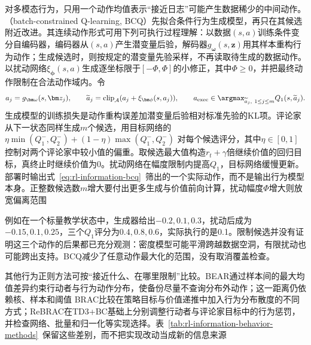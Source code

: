 对多模态行为，只用一个动作均值表示“接近日志”可能产生数据稀少的中间动作。（batch-constrained Q-learning, BCQ）先拟合条件行为生成模型，再只在其候选附近改进。其连续动作形式可用下列可执行过程理解：以数据$(s,a)$训练条件变分自编码器，编码器从$(s,a)$产生潜变量后验，解码器$g_{\bm\omega}(s,\bm z)$用其样本重构行为动作；生成候选时，则按规定的潜变量先验采样，不再读取待生成的数据动作。以扰动网络$\xi_{\bm\phi}(s,a)$生成逐坐标限于$[-\Phi,\Phi]$的小修正，其中$\Phi\geq0$，并把最终动作限制在合法动作域内。令
\begin{equation}
  \label{eq:rl-information-bcq}
  a_j=g_{\bm\omega}(s,\bm z_j),\qquad
  \widetilde a_j=\operatorname{clip}_{\mathcal A}
                  (a_j+\xi_{\bm\phi}(s,a_j)),\qquad
  a_{\mathrm{exec}}\in\argmax_{\widetilde a_j,\ 1\leq j\leq m}
                  Q_1(s,\widetilde a_j).
\end{equation}
生成模型的训练损失是动作重构误差加潜变量后验相对标准先验的KL项。评论家从下一状态同样生成$m$个候选，用目标网络的
$\eta\min(Q_1^-,Q_2^-)+(1-\eta)\max(Q_1^-,Q_2^-)$
对每个候选评分，其中$\eta\in[0,1]$控制对两个评论家中较小值的偏重。取候选最大值构造$r_t+\gamma$倍继续价值的回归目标，真终止时继续价值为0。扰动网络在幅度限制内提高$Q_1$，目标网络缓慢更新。部署时输出式~\eqref{eq:rl-information-bcq}~筛出的一个实际动作，而不是输出行为模型本身。正整数候选数$m$增大要付出更多生成与价值前向计算，扰动幅度$\Phi$增大则放宽偏离范围

例如在一个标量教学状态中，生成器给出$-0.2,0.1,0.3$，扰动后成为$-0.15,0.1,0.25$，三个$Q_1$评分为$0.4,0.8,0.6$，实际执行的是0.1。限制候选并没有证明这三个动作的后果都已充分观测：密度模型可能平滑跨越数据空洞，有限扰动也可能跨出支持。BCQ减少了任意动作最大化的范围，没有取消覆盖检查。

其他行为正则方法可按“接近什么、在哪里限制”比较。BEAR通过样本间的最大均值差异约束行动者与行为动作分布，使备份尽量不查询分布外动作；这一距离仍依赖核、样本和阈值
BRAC比较在策略目标与价值递推中加入行为分布散度的不同方式；ReBRAC在TD3+BC基础上分别调整行动者与评论家目标中的行为惩罚，并检查网络、批量和归一化等实现选择。表~\ref{tab:rl-information-behavior-methods}~保留这些差别，而不把实现改动当成新的信息来源

